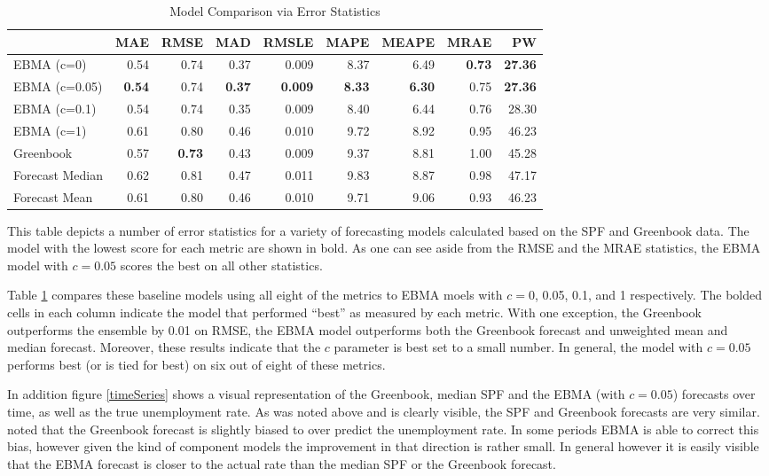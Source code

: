 \documentclass[12pt,fullpage,endnotes]{article}
\begin{document}
\begin{table}[h]
\caption{Model Comparison via Error Statistics}
\begin{center}
\begin{tabular}{lrrrrrrrr}
\toprule
 & MAE & RMSE & MAD & RMSLE & MAPE & MEAPE & MRAE & PW \\ 
\midrule
 EBMA (c=0)& 0.54 & 0.74 & 0.37 & 0.009 & 8.37 & 6.49 & \textbf{0.73} & \textbf{27.36} \\ 
  EBMA (c=0.05)& \textbf{0.54} & 0.74 &\textbf{ 0.37} & \textbf{0.009} & \textbf{8.33} & \textbf{6.30} & 0.75 & \textbf{27.36} \\ 
 EBMA (c=0.1)& 0.54 & 0.74 & 0.35 & 0.009 & 8.40 & 6.44 & 0.76 & 28.30 \\ 
EBMA (c=1) & 0.61 & 0.80 & 0.46 & 0.010 & 9.72 & 8.92 & 0.95 & 46.23 \\ 
 Greenbook& 0.57 & \textbf{0.73} & 0.43 & 0.009 & 9.37 & 8.81 & 1.00 & 45.28 \\ 
 Forecast Median& 0.62 & 0.81 & 0.47 & 0.011 & 9.83 & 8.87 & 0.98 & 47.17 \\ 
Forecast Mean& 0.61 & 0.80 & 0.46 & 0.010 & 9.71 & 9.06 & 0.93 & 46.23 \\ 
\bottomrule
\end{tabular}
\end{center}

\label{compareTable1}
This table depicts a number of error statistics for a variety of forecasting models calculated based on the SPF and Greenbook data. The model with the lowest score for each metric are shown in bold. As one can see aside from the RMSE and the MRAE statistics, the EBMA model with $c=0.05$ scores the best on all other statistics. 
\end{table}

Table \ref{compareTable1} compares these baseline models using all
eight of the metrics to EBMA moels with $c=$0, 0.05, 0.1, and 1
respectively.  The bolded cells in each column indicate the model that
performed ``best'' as measured by each metric.  With one exception,
the Greenbook outperforms the ensemble by 0.01 on RMSE, the EBMA model
outperforms both the Greenbook forecast and unweighted mean and
median forecast.  Moreover, these results indicate that the $c$
parameter is best set to a small number.  In general, the model with
$c=0.05$ performs best (or is tied for best) on six out of eight of
these metrics.

In addition figure \ref{timeSeries} shows a visual representation of the Greenbook, median SPF and the EBMA (with $c=0.05$) forecasts over time, as well as the true unemployment rate. As was noted above and is clearly visible, the SPF and Greenbook forecasts are very similar. \citet{Baghestani:2008} noted that the Greenbook forecast is slightly biased to over predict the unemployment rate. In some periods EBMA is able to correct this bias, however given the kind of component models the improvement in that direction is rather small. In general however it is easily visible that the EBMA forecast is closer to the actual rate than the median SPF or the Greenbook forecast.
\end{document}
